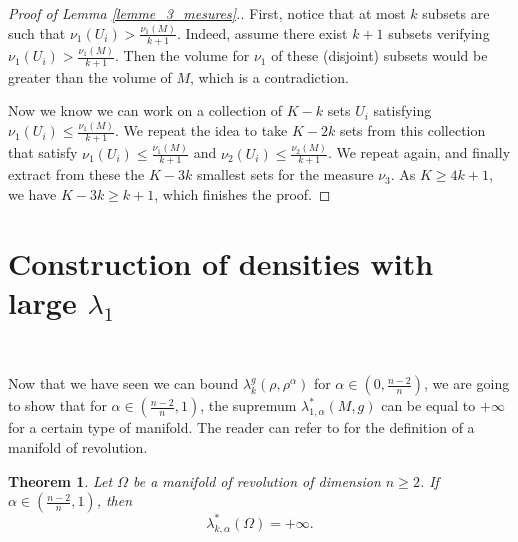 \documentclass[12pt,reqno]{amsart}		%
\theoremstyle{plain}
\newtheorem{theorem}{Theorem}%
\theoremstyle{definition}
\theoremstyle{remark}
\numberwithin{equation}{section}
\begin{document}
\begin{proof}[Proof of Lemma \ref{lemme_3_mesures}.]

First, notice that at most $k$ subsets are such that $\nu_1(U_i)>\frac{\nu_1(M)}{k+1}$. Indeed, assume there exist $k+1$ subsets verifying $\nu_1(U_i) > \frac{\nu_1(M)}{k+1}$. Then the volume for $\nu_1$ of these (disjoint) subsets would be greater than the volume of $M$, which is a contradiction.

Now we know we can work on a collection of $K-k$ sets $U_i$ satisfying $\nu_1(U_i) \leqslant \frac{\nu_1(M)}{k+1}$. We repeat the idea to take $K-2k$ sets from this collection that satisfy $\nu_1(U_i) \leqslant \frac{\nu_1(M)}{k+1}$ and $\nu_2(U_i) \leqslant \frac{\nu_2(M)}{k+1}$. We repeat again, and finally extract from these the $K-3k$ smallest sets for the measure $\nu_3$. As $K\geqslant 4k+1$, we have $K-3k \geqslant k+1$, which finishes the proof.

	\end{proof}






\section{Construction of densities with large \texorpdfstring{$\lambda_{1}$}{Lg}}\ %
 
 Now that we have seen we can bound $\lambda_{k}^g(\rho,\rho^{\alpha})$ for $\alpha \in \left(0,\frac{n-2}{n}\right)$, we are going to show that for $\alpha \in \left(\frac{n-2}{n},1\right)$, the supremum $\lambda_{1,\alpha}^{*}(M,g)$ can be equal to $+\infty$ for a certain type of manifold.
The reader can refer to \cite[Section 5]{colbois_soufi_savo_2015} for the definition of a manifold of revolution.
 
\begin{theorem}
	\label{thm_sup_infini}
	Let $\Omega$ be a manifold of revolution of dimension $n \geqslant 2$.
If $\alpha \in \left(\frac{n-2}{n},1\right)$, then
	\begin{equation*}
	\lambda^{*}_{k,\alpha}(\Omega)=+\infty .
	\end{equation*}
\end{theorem}
\end{document}
